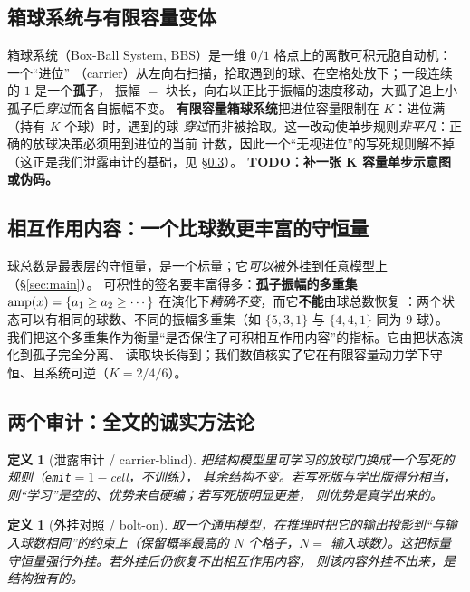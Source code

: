 \documentclass[11pt]{article}
\newtheorem{Definition}[Theorem]{定义}
\theoremstyle{definition}
\theoremstyle{plain}
\begin{document}
\subsection{箱球系统与有限容量变体}\label{sec:setup:bbs}
箱球系统（Box-Ball System, BBS）是一维 $0/1$ 格点上的离散可积元胞自动机：一个“进位”
（carrier）从左向右扫描，拾取遇到的球、在空格处放下；一段连续的 $1$ 是一个\textbf{孤子}，
振幅 $=$ 块长，向右以正比于振幅的速度移动，大孤子追上小孤子后\emph{穿过}而各自振幅不变。
\textbf{有限容量箱球系统}把进位容量限制在 $K$：进位满（持有 $K$ 个球）时，遇到的球
\emph{穿过}而非被拾取。这一改动使单步规则\emph{非平凡}：正确的放球决策必须用到进位的当前
计数，因此一个“无视进位”的写死规则解不掉（这正是我们泄露审计的基础，见 \S\ref{sec:setup:audits}）。
\textbf{TODO：补一张 K 容量单步示意图或伪码。}

\subsection{相互作用内容：一个比球数更丰富的守恒量}\label{sec:setup:content}
球总数是最表层的守恒量，是一个标量；它\emph{可以}被外挂到任意模型上（\S\ref{sec:main}）。
可积性的签名要丰富得多：\textbf{孤子振幅的多重集}
$\mathrm{amp}(x)=\{a_1\ge a_2\ge\cdots\}$ 在演化下\emph{精确不变}，而它\textbf{不能}由球总数恢复
：两个状态可以有相同的球数、不同的振幅多重集（如 $\{5,3,1\}$ 与 $\{4,4,1\}$ 同为 $9$ 球）。
我们把这个多重集作为衡量“是否保住了可积相互作用内容”的指标。它由把状态演化到孤子完全分离、
读取块长得到；我们数值核实了它在有限容量动力学下守恒、且系统可逆（$K=2/4/6$）。

\subsection{两个审计：全文的诚实方法论}\label{sec:setup:audits}
\begin{Definition}[泄露审计 / carrier-blind]\label{def:leak}
把结构模型里\emph{可学习}的放球门换成一个\emph{写死}的规则（\texttt{emit}$=1-$cell，不训练），
其余结构不变。若写死版与学出版得分相当，则“学习”是空的、优势来自硬编；若写死版明显更差，
则优势是\emph{真学出来的}。
\end{Definition}

\begin{Definition}[外挂对照 / bolt-on]\label{def:bolton}
取一个通用模型，在推理时把它的输出\emph{投影}到“与输入球数相同”的约束上（保留概率最高的
$N$ 个格子，$N=$ 输入球数）。这把标量守恒量\emph{强行外挂}。若外挂后仍恢复不出相互作用内容，
则该内容\emph{外挂不出来}，是结构独有的。
\end{Definition}
\end{document}
